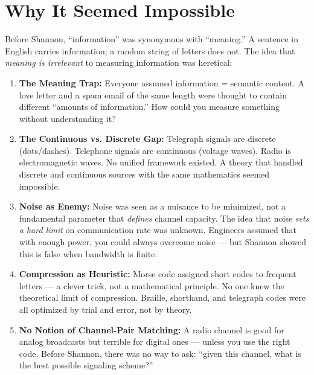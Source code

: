 \section{Why It Seemed Impossible}
\label{sec:information:impossible}

Before Shannon, ``information'' was synonymous with ``meaning.'' A sentence in English carries information; a random string of letters does not. The idea that \emph{meaning is irrelevant} to measuring information was heretical:

\begin{enumerate}
\item \textbf{The Meaning Trap:} Everyone assumed information = semantic content. A love letter and a spam email of the same length were thought to contain different ``amounts of information.'' How could you measure something without understanding it?

\item \textbf{The Continuous vs. Discrete Gap:} Telegraph signals are discrete (dots/dashes). Telephone signals are continuous (voltage waves). Radio is electromagnetic waves. No unified framework existed. A theory that handled discrete and continuous sources with the same mathematics seemed impossible.

\item \textbf{Noise as Enemy:} Noise was seen as a nuisance to be minimized, not a fundamental parameter that \emph{defines} channel capacity. The idea that noise \emph{sets a hard limit} on communication rate was unknown. Engineers assumed that with enough power, you could always overcome noise — but Shannon showed this is false when bandwidth is finite.

\item \textbf{Compression as Heuristic:} Morse code assigned short codes to frequent letters — a clever trick, not a mathematical principle. No one knew the theoretical limit of compression. Braille, shorthand, and telegraph codes were all optimized by trial and error, not by theory.

\item \textbf{No Notion of Channel-Pair Matching:} A radio channel is good for analog broadcasts but terrible for digital ones — unless you use the right code. Before Shannon, there was no way to ask: ``given this channel, what is the best possible signaling scheme?''
\end{enumerate}

